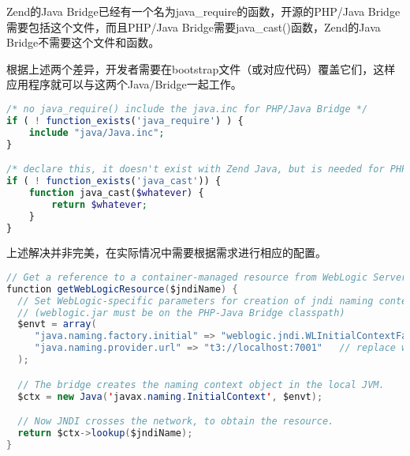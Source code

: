 Zend的Java Bridge已经有一个名为java\_require的函数，开源的PHP/Java Bridge需要包括这个文件，而且PHP/Java Bridge需要java\_cast()函数，Zend的Java Bridge不需要这个文件和函数。

根据上述两个差异，开发者需要在bootstrap文件（或对应代码）覆盖它们，这样应用程序就可以与这两个Java/Bridge一起工作。

\begin{lstlisting}[language=PHP]
/* no java_require() include the java.inc for PHP/Java Bridge */
if ( ! function_exists('java_require') ) {
    include "java/Java.inc";
}

/* declare this, it doesn't exist with Zend Java, but is needed for PHP/Java Bridge */
if ( ! function_exists('java_cast')) {
    function java_cast($whatever) {
        return $whatever;
    }
}
\end{lstlisting}

上述解决并非完美，在实际情况中需要根据需求进行相应的配置。

\begin{lstlisting}[language=Java]
// Get a reference to a container-managed resource from WebLogic Server
function getWebLogicResource($jndiName) {
  // Set WebLogic-specific parameters for creation of jndi naming context:
  // (weblogic.jar must be on the PHP-Java Bridge classpath)
  $envt = array(
     "java.naming.factory.initial" => "weblogic.jndi.WLInitialContextFactory",
     "java.naming.provider.url" => "t3://localhost:7001"   // replace with your target server URL
  );  

  // The bridge creates the naming context object in the local JVM.
  $ctx = new Java('javax.naming.InitialContext', $envt);

  // Now JNDI crosses the network, to obtain the resource.
  return $ctx->lookup($jndiName);
}
\end{lstlisting}





\begin{lstlisting}[language=PHP]

\end{lstlisting}




\begin{lstlisting}[language=PHP]

\end{lstlisting}



\begin{lstlisting}[language=PHP]

\end{lstlisting}



